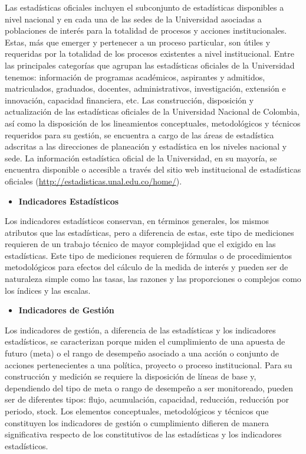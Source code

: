 \documentclass[
]{book}
\providecommand{\tightlist}{%
  \setlength{\itemsep}{0pt}\setlength{\parskip}{0pt}}
\begin{document}
Las estadísticas oficiales incluyen el subconjunto de estadísticas disponibles a nivel nacional y en cada una de las sedes de la Universidad asociadas a poblaciones de interés para la totalidad de procesos y acciones institucionales. Estas, más que emerger y pertenecer a un proceso particular, son útiles y requeridas por la totalidad de los procesos existentes a nivel institucional. Entre las principales categorías que agrupan las estadísticas oficiales de la Universidad tenemos: información de programas académicos, aspirantes y admitidos, matriculados, graduados, docentes, administrativos, investigación, extensión e innovación, capacidad financiera, etc. Las construcción, disposición y actualización de las estadísticas oficiales de la Universidad Nacional de Colombia, así como la disposición de los lineamientos conceptuales, metodológicos y técnicos requeridos para su gestión, se encuentra a cargo de las áreas de estadística adscritas a las direcciones de planeación y estadística en los niveles nacional y sede. La información estadística oficial de la Universidad, en su mayoría, se encuentra disponible o accesible a través del sitio web institucional de estadísticas oficiales (\url{http://estadisticas.unal.edu.co/home/}).

\begin{itemize}
\tightlist
\item
  \textbf{Indicadores Estadísticos}
\end{itemize}

Los indicadores estadísticos conservan, en términos generales, los mismos atributos que las estadísticas, pero a diferencia de estas, este tipo de mediciones requieren de un trabajo técnico de mayor complejidad que el exigido en las estadísticas. Este tipo de mediciones requieren de fórmulas o de procedimientos metodológicos para efectos del cálculo de la medida de interés y pueden ser de naturaleza simple como las tasas, las razones y las proporciones o complejos como los índices y las escalas.

\begin{itemize}
\tightlist
\item
  \textbf{Indicadores de Gestión}
\end{itemize}

Los indicadores de gestión, a diferencia de las estadísticas y los indicadores estadísticos, se caracterizan porque miden el cumplimiento de una apuesta de futuro (meta) o el rango de desempeño asociado a una acción o conjunto de acciones pertenecientes a una política, proyecto o proceso institucional. Para su construcción y medición se requiere la disposición de líneas de base y, dependiendo del tipo de meta o rango de desempeño a ser monitoreado, pueden ser de diferentes tipos: flujo, acumulación, capacidad, reducción, reducción por periodo, stock. Los elementos conceptuales, metodológicos y técnicos que constituyen los indicadores de gestión o cumplimiento difieren de manera significativa respecto de los constitutivos de las estadísticas y los indicadores estadísticos.
\end{document}
